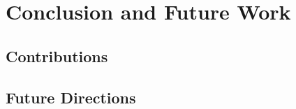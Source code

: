 \chapter{Conclusion and Future Work}
\label{ch:conclusion}

\section{Contributions}

\section{Future Directions}
